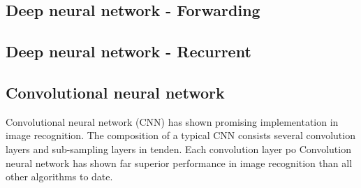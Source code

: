 \subsection{Deep neural network - Forwarding}
\subsection{Deep neural network - Recurrent}
\subsection{Convolutional neural network}
Convolutional neural network (CNN) has shown promising implementation in image recognition. The composition of a typical CNN consists several convolution layers and sub-sampling layers in tenden. Each convolution layer po
Convolution neural network has shown far superior performance in image recognition than all other algorithms to date.~\cite{Szegedy_2015}